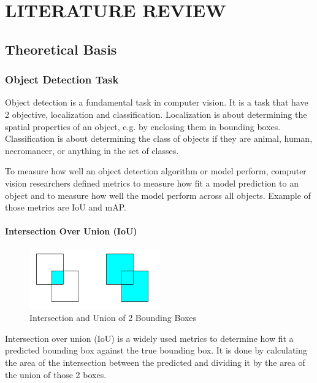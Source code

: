\chapter{LITERATURE REVIEW}
\section{Theoretical Basis}
  \subsection{Object Detection Task}

  Object detection is a fundamental task in computer vision.
  It is a task that have 2 objective, localization and classification.
  Localization is about determining the spatial properties of an object, e.g. by
  enclosing them in bounding boxes. Classification is about determining the class of
  objects if they are animal, human, necromancer, or anything in the set of classes.

  To measure how well an object detection algorithm or model perform, computer vision
  researchers defined metrics to measure how fit a model prediction to an object
  and to measure how well the model perform across all objects. Example of those metrics are IoU and mAP.

  \subsubsection{Intersection Over Union (IoU)}
   \begin{figure}[H]
        \centering
        \includegraphics[width=0.5\textwidth]{figures/inter-union.png}
        \caption{Intersection and Union of 2 Bounding Boxes}
        \label{fig:inter-union}
    \end{figure}
  Intersection over union (IoU) is a widely used metrics to determine how fit a predicted bounding box against the true bounding box.
  It is done by calculating the area of the intersection between the predicted and dividing it by the area of the
  union of those 2 boxes. 
  
